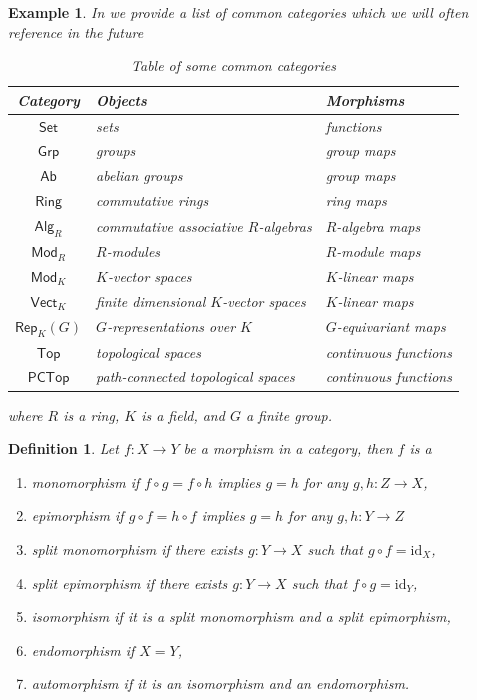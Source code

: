 \documentclass[10pt]{book}
\theoremstyle{bookplain}
\theoremstyle{bookdefinition}
\newtheorem{definition}[theorem]{Definition}
\newtheorem{example}[theorem]{Example}
\theoremstyle{bookremark}
\begin{document}
\begin{example} In  we provide a list of common categories which we will often reference in the future

\begin{table}[ht]
\centering
\caption{Table of some common categories}
\label{tab:cat}
\scriptsize
\setlength{\tabcolsep}{3pt}
\begin{tabular}[t]{c|p{}|p{}}
\textit{Category} & \textit{Objects} & \textit{Morphisms}\\
\hline
$\mathsf{Set}$ & sets & functions\\
$\mathsf{Grp}$ & groups & group maps\\
$\mathsf{Ab}$ & abelian groups & group maps \\
$\mathsf{Ring}$ & commutative rings & ring maps\\
$\mathsf{Alg}_R$ & commutative associative $R$-algebras & $R$-algebra maps\\
$\mathsf{Mod}_R$ & $R$-modules & $R$-module maps\\
$\mathsf{Mod}_K$ & $K$-vector spaces & $K$-linear maps\\
$\mathsf{Vect}_K$ & finite dimensional $K$-vector spaces & $K$-linear maps\\
$\mathsf{Rep}_K(G)$ & $G$-representations over $K$ & $G$-equivariant maps\\
$\mathsf{Top}$ & topological spaces & continuous functions\\
$\mathsf{PCTop}$ & path-connected topological spaces & continuous functions\\
\end{tabular}
\end{table}
\noindent where $R$ is a ring, $K$ is a field, and $G$ a finite group. 
\end{example}

\begin{definition}Let $f:X\rightarrow Y$ be a morphism in a category, then $f$ is a 
    \begin{enumerate}
	\item \textit{monomorphism} if $f\circ g=f\circ h$ implies $g=h$ for any $g,h:Z\rightarrow X$,
	\item \textit{epimorphism} if $g\circ f=h\circ f$ implies $g=h$ for any $g,h:Y\rightarrow Z$ 
	\item \textit{split monomorphism} if there exists $g:Y\rightarrow X$ such that $g\circ f=\mathrm{id}_X$,
	\item \textit{split epimorphism} if there exists $g:Y\rightarrow X$ such that $f\circ g=\mathrm{id}_Y$,
	\item \textit{isomorphism} if it is a split monomorphism and a split epimorphism,
	\item \textit{endomorphism} if $X=Y$,
    \item \textit{automorphism} if it is an isomorphism and an endomorphism. 
\end{enumerate}
\end{definition}
\end{document}
